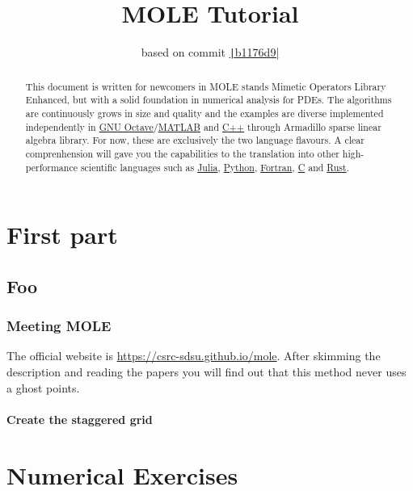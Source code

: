 \documentclass[a4paper,abstract=true]{scrreprt}
\title{\color{DarkBlue}MOLE Tutorial}
\author{based on commit \href{https://github.com/csrc-sdsu/mole/tree/b1176d9969e807fb62bed8fee28bc0eb9648a93a}{\texttt|b1176d9|}}
\begin{document}
\maketitle

\begin{abstract}
    This document is written for newcomers in MOLE stands
    Mimetic Operators Library Enhanced, but with a solid foundation
    in numerical analysis for PDEs.
    The algorithms are continuously grows in size and quality and the
    examples are diverse implemented independently in
    \href{https://octave.org}{GNU Octave}/\href{https://www.mathworks.com/products/matlab.html}{MATLAB}
    and \href{https://isocpp.org}{C++} through Armadillo sparse
    linear algebra library.
    For now, these are exclusively the two language flavours.
    A clear comprenhension will gave you the capabilities to the translation
    into other high-performance scientific languages such as \href{https://julialang.org}{Julia},
    \href{https://www.python.org}{Python}, \href{https://fortran-lang.org}{Fortran}, \href{https://www.open-std.org/jtc1/sc22/wg14}{C}
    and \href{https://www.rust-lang.org}{Rust}.
\end{abstract}

\part{First part}

\chapter{Foo}

\section{Meeting MOLE}

The official website is \url{https://csrc-sdsu.github.io/mole}.
After skimming the description and reading the papers you will find out that this method never uses a ghost points.

\subsection{Create the staggered grid}


\part{Numerical Exercises}
\end{document}
